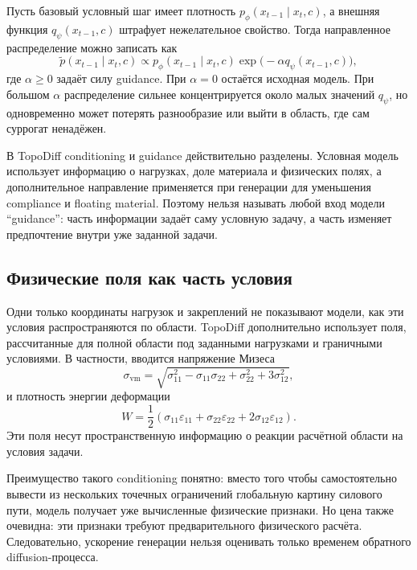 Пусть базовый условный шаг имеет плотность $p_\phi(x_{t-1}\mid x_t,c)$, а внешняя функция $q_\psi(x_{t-1},c)$ штрафует нежелательное свойство. Тогда направленное распределение можно записать как
\begin{equation}
 \widetilde p(x_{t-1}\mid x_t,c)
 \propto
 p_\phi(x_{t-1}\mid x_t,c)
 \exp\!\bigl(-\alpha q_\psi(x_{t-1},c)\bigr),
\end{equation}
где $\alpha\geq0$ задаёт силу guidance. При $\alpha=0$ остаётся исходная модель. При большом $\alpha$ распределение сильнее концентрируется около малых значений $q_\psi$, но одновременно может потерять разнообразие или выйти в область, где сам суррогат ненадёжен.

В TopoDiff conditioning и guidance действительно разделены. Условная модель использует информацию о нагрузках, доле материала и физических полях, а дополнительное направление применяется при генерации для уменьшения compliance и floating material. Поэтому нельзя называть любой вход модели ``guidance'': часть информации задаёт саму условную задачу, а часть изменяет предпочтение внутри уже заданной задачи.

\subsection{Физические поля как часть условия}

Одни только координаты нагрузок и закреплений не показывают модели, как эти условия распространяются по области. TopoDiff дополнительно использует поля, рассчитанные для полной области под заданными нагрузками и граничными условиями. В частности, вводится напряжение Мизеса
\begin{equation}
 \sigma_{\mathrm{vm}}
 =
 \sqrt{
  \sigma_{11}^{2}
  -\sigma_{11}\sigma_{22}
  +\sigma_{22}^{2}
  +3\sigma_{12}^{2}
 },
\end{equation}
и плотность энергии деформации
\begin{equation}
 W
 =
 \frac12
 \left(
  \sigma_{11}\varepsilon_{11}
  +\sigma_{22}\varepsilon_{22}
  +2\sigma_{12}\varepsilon_{12}
 \right).
\end{equation}
Эти поля несут пространственную информацию о реакции расчётной области на условия задачи.

Преимущество такого conditioning понятно: вместо того чтобы самостоятельно вывести из нескольких точечных ограничений глобальную картину силового пути, модель получает уже вычисленные физические признаки. Но цена также очевидна: эти признаки требуют предварительного физического расчёта. Следовательно, ускорение генерации нельзя оценивать только временем обратного diffusion-процесса.

